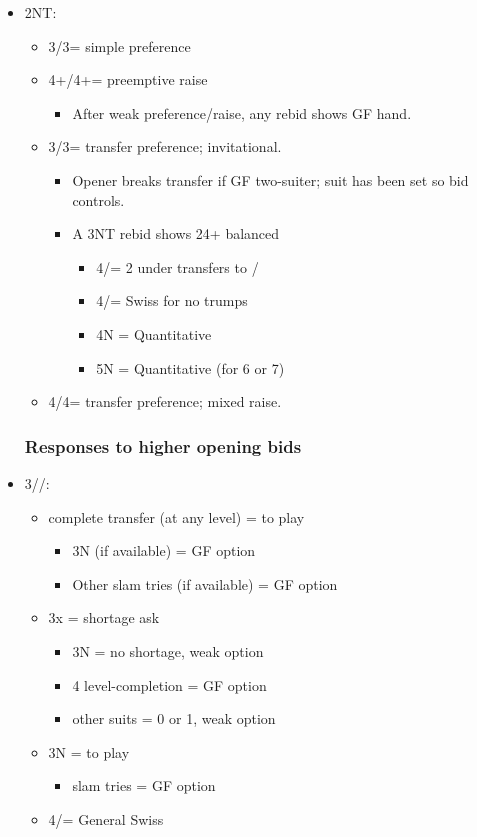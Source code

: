 \documentclass[a4paper,14pt]{extarticle}
\begin{document}
\begin{itemize}
\item 2NT:
	\begin{itemize}
   \item 3\diamonds/3\spades = simple preference
   \item 4+\diamonds/4+\spades = preemptive raise
		\begin{itemize}
      \item After weak preference/raise, any rebid shows GF hand.
		\end{itemize}
   \item 3\clubs/3\hearts = transfer preference; invitational.
		\begin{itemize}
      \item Opener breaks transfer if GF two-suiter; suit has been set so bid controls.
      \item A 3NT rebid shows 24+ balanced
			\begin{itemize}
         \item 4\clubs/\diamonds = 2 under transfers to \hearts/\spades
         \item 4\hearts/\spades = Swiss for no trumps 
         \item 4N = Quantitative
         \item 5N = Quantitative (for 6 or 7)
			\end{itemize}
		\end{itemize}
   \item 4\clubs/4\hearts = transfer preference; mixed raise.
	\end{itemize}

\newpage

\subsubsection{Responses to higher opening bids}
\label{sec:resp:higher}

\item 3\clubs/\diamonds/\hearts:
	\begin{itemize}
	\item complete transfer (at any level) = to play
		\begin{itemize}
		\item 3N (if available) = GF option
		\item Other slam tries (if available) = GF option
		\end{itemize}
	\item 3x = shortage ask
		\begin{itemize}
		\item 3N = no shortage, weak option
		\item 4 level-completion = GF option
		\item other suits = 0 or 1, weak option
		\end{itemize}
	\item 3N = to play
		\begin{itemize}
		\item slam tries = GF option
		\end{itemize}
	\item 4\clubs/\diamonds = General Swiss~
	\end{itemize}


\end{itemize}
\end{document}
